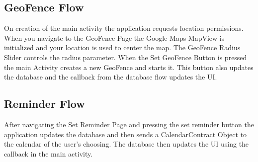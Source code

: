 \documentclass{article}
\begin{document}
\subsection{GeoFence Flow}
On creation of the main activity the application requests location permissions. When you navigate to the GeoFence Page the Google Maps MapView is initialized and your location is used to center the map. The GeoFence Radius Slider controls the radius parameter. When the Set GeoFence Button is pressed the main Activity creates a new GeoFence and starts it. This button also updates the database and the callback from the database flow updates the UI.

\subsection{Reminder Flow}
After navigating the Set Reminder Page and pressing the set reminder button the application updates the database and then sends a CalendarContract Object to the calendar of the user's choosing. The database then updates the UI using the callback in the main activity.
\end{document}
